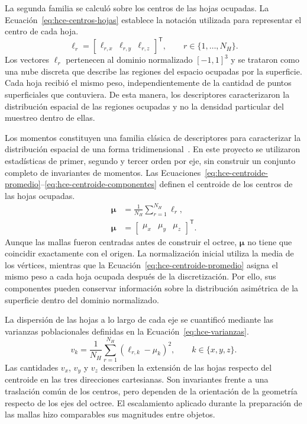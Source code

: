 La segunda familia se calculó sobre los centros de las hojas ocupadas. La Ecuación~\eqref{eq:hce-centros-hojas} establece la notación utilizada para representar el centro de cada hoja.
\begin{equation}
\boldsymbol{\ell}_r=
\begin{bmatrix}
\ell_{r,x} & \ell_{r,y} & \ell_{r,z}
\end{bmatrix}^{\mathsf T},
\qquad r\in\{1,\ldots,N_H\}.
\label{eq:hce-centros-hojas}
\end{equation}
Los vectores $\boldsymbol{\ell}_r$ pertenecen al dominio normalizado $[-1,1]^3$ y se trataron como una nube discreta que describe las regiones del espacio ocupadas por la superficie. Cada hoja recibió el mismo peso, independientemente de la cantidad de puntos superficiales que contuviera. De esta manera, los descriptores caracterizaron la distribución espacial de las regiones ocupadas y no la densidad particular del muestreo dentro de ellas.

Los momentos constituyen una familia clásica de descriptores para caracterizar la distribución espacial de una forma tridimensional~\parencite{sadjadi1980}. En este proyecto se utilizaron estadísticas de primer, segundo y tercer orden por eje, sin construir un conjunto completo de invariantes de momentos. Las Ecuaciones~\eqref{eq:hce-centroide-promedio}--\eqref{eq:hce-centroide-componentes} definen el centroide de los centros de las hojas ocupadas.
\begin{subequations}\label{eq:hce-centroide}
\begin{align}
\boldsymbol\mu&=\frac{1}{N_H}\sum_{r=1}^{N_H}\boldsymbol\ell_r, \label{eq:hce-centroide-promedio} \\
\boldsymbol\mu&=\begin{bmatrix}\mu_x&\mu_y&\mu_z\end{bmatrix}^{\mathsf T}. \label{eq:hce-centroide-componentes}
\end{align}
\end{subequations}
Aunque las mallas fueron centradas antes de construir el octree, $\boldsymbol{\mu}$ no tiene que coincidir exactamente con el origen. La normalización inicial utiliza la media de los vértices, mientras que la Ecuación~\eqref{eq:hce-centroide-promedio} asigna el mismo peso a cada hoja ocupada después de la discretización. Por ello, sus componentes pueden conservar información sobre la distribución asimétrica de la superficie dentro del dominio normalizado.

La dispersión de las hojas a lo largo de cada eje se cuantificó mediante las varianzas poblacionales definidas en la Ecuación~\eqref{eq:hce-varianzas}.
\begin{equation}
v_k
=
\frac{1}{N_H}
\sum_{r=1}^{N_H}
\left(\ell_{r,k}-\mu_k\right)^2,
\qquad k\in\{x,y,z\}.
\label{eq:hce-varianzas}
\end{equation}
Las cantidades $v_x$, $v_y$ y $v_z$ describen la extensión de las hojas respecto del centroide en las tres direcciones cartesianas. Son invariantes frente a una traslación común de los centros, pero dependen de la orientación de la geometría respecto de los ejes del octree. El escalamiento aplicado durante la preparación de las mallas hizo comparables sus magnitudes entre objetos.


